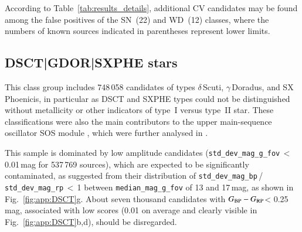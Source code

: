 \documentclass[longauth]{aa}
\def\gdr3{\textit{Gaia}~DR3\xspace}
\def\bprp{\mbox{$G_{\rm BP}-G_{\rm RP}$}\xspace}
\begin{document}
According to Table~\ref{tab:results_details}, additional CV candidates may be found among the false positives of the SN~(22) and WD~(12) classes, where the numbers of known sources indicated in parentheses represent lower limits.


\subsection{DSCT|GDOR|SXPHE stars\label{ssec:dsct}}

This class group includes 748\,058 candidates of types $\delta$\,Scuti, $\gamma$\,Doradus, and SX\,Phoenicis, in particular as DSCT and SXPHE types could not be distinguished without metallicity or other indicators of type~I versus type~II star. These classifications were also the main contributors to the upper main-sequence oscillator SOS module \citep[see sect.~10.14 of the \gdr3 documentation;][]{2022gdr3.reptE..10R}, which were further analysed in \citet{DR3-DPACP-79}.

This sample is dominated by low amplitude candidates (\texttt{std\_dev\_mag\_g\_fov}\,$<$\,0.01\,mag for 537\,769 sources), which are expected to be significantly contaminated, as suggested from their distribution of \texttt{std\_dev\_mag\_bp}\,/\,\texttt{std\_dev\_mag\_rp}\,$<$\,1 between \texttt{median\_mag\_g\_fov} of 13 and 17\,mag, as shown in Fig.~\ref{fig:app:DSCT}g.
About seven thousand candidates with \bprp < 0.25\,mag, associated with low scores (0.01 on average and clearly visible in Fig.~\ref{fig:app:DSCT}b,d), should be disregarded. 
\end{document}
